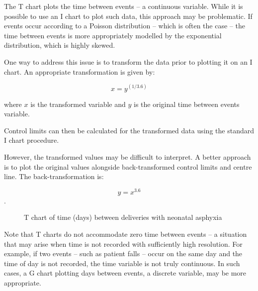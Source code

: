 \documentclass[
]{book}
\makeatletter
\newenvironment{Shaded}{\begin{snugshade}}{\end{snugshade}}
\newcommand{\AttributeTok}[1]{\textcolor[rgb]{0.13,0.29,0.53}{#1}}
\newcommand{\CommentTok}[1]{\textcolor[rgb]{0.56,0.35,0.01}{\textit{#1}}}
\newcommand{\FunctionTok}[1]{\textcolor[rgb]{0.13,0.29,0.53}{\textbf{#1}}}
\newcommand{\NormalTok}[1]{#1}
\newcommand{\OtherTok}[1]{\textcolor[rgb]{0.56,0.35,0.01}{#1}}
\newcommand{\SpecialCharTok}[1]{\textcolor[rgb]{0.81,0.36,0.00}{\textbf{#1}}}
\newcommand{\StringTok}[1]{\textcolor[rgb]{0.31,0.60,0.02}{#1}}
\newcommand*\pandocbounded[1]{%
  \sbox\pandoc@box{#1}%
  \Gscale@div\@tempa{\textheight}{\dimexpr\ht\pandoc@box+\dp\pandoc@box\relax}%
  \Gscale@div\@tempb{\linewidth}{\wd\pandoc@box}%
  \ifdim\@tempb\p@<\@tempa\p@\let\@tempa\@tempb\fi%
  \ifdim\@tempa\p@<\p@\scalebox{\@tempa}{\usebox\pandoc@box}%
  \else\usebox{\pandoc@box}%
  \fi%
}
\makeatother
\begin{document}
The T chart plots the time between events -- a continuous variable. While it is possible to use an I chart to plot such data, this approach may be problematic. If events occur according to a Poisson distribution -- which is often the case -- the time between events is more appropriately modelled by the exponential distribution, which is highly skewed.

One way to address this issue is to transform the data prior to plotting it on an I chart. An appropriate transformation is given by:

\[x = y^{(1 / 3.6)}\]

where \(x\) is the transformed variable and \(y\) is the original time between events variable.

Control limits can then be calculated for the transformed data using the standard I chart procedure.

However, the transformed values may be difficult to interpret. A better approach is to plot the original values alongside back-transformed control limits and centre line. The back-transformation is:

\[y=x^{3.6}\].

\begin{Shaded}
\end{Shaded}

\begin{figure}
\centering
\pandocbounded{}
\caption{\label{fig:rare-fig5}T chart of time (days) between deliveries with neonatal asphyxia}
\end{figure}

Note that T charts do not accommodate zero time between events -- a situation that may arise when time is not recorded with sufficiently high resolution. For example, if two events -- such as patient falls -- occur on the same day and the time of day is not recorded, the time variable is not truly continuous. In such cases, a G chart plotting days between events, a discrete variable, may be more appropriate.
\end{document}
